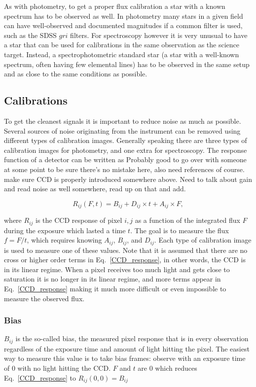 \documentclass[a4paper,oneside,12pt, class=Latex/Classes/PhDthesisPSnPDF, crop=false]{standalone}
\begin{document}
As with photometry, to get a proper flux calibration a star with a known spectrum has to be observed as well. In photometry many stars in a given field can have well-observed and documented magnitudes if a common filter is used, such as the SDSS $gri$ filters. For spectroscopy however it is very unusual to have a star that can be used for calibrations in the same observation as the science target. Instead, a spectrophotometric standard star (a star with a well-known spectrum, often having few elemental lines) has to be observed in the same setup and as close to the same conditions as possible.

\subsection{Calibrations}
To get the cleanest signals it is important to reduce noise as much as possible. Several sources of noise originating from the instrument can be removed using different types of calibration images. Generally speaking there are three types of calibration images for photometry, and one extra for spectroscopy. The response function of a detector can be written as \color{red} Probably good to go over with someone at some point to be sure there's no mistake here, also need references of course. make sure CCD is properly introduced somewhere above. Need to talk about gain and read noise as well somewhere, read up on that and add. \color{black}

\begin{equation}
	R_{ij}(F, t) = B_{ij} + D_{ij} \times t + A_{ij} \times F,
	\label{CCD_response}
\end{equation}

where $R_{ij}$ is the CCD response of pixel $i,j$ as a function of the integrated flux $F$ during the exposure which lasted a time $t$. The goal is to measure the flux $f = F/t$, which requires knowing $A_{ij}$, $B_{ij}$, and $D_{ij}$. Each type of calibration image is used to measure one of these values. Note that it is assumed that there are no cross or higher order terms in Eq.~\ref{CCD_response}, in other words, the CCD is in its linear regime. When a pixel receives too much light and gets close to saturation it is no longer in its linear regime, and more terms appear in Eq.~\ref{CCD_response} making it much more difficult or even impossible to measure the observed flux.

\subsubsection*{Bias}
$B_{ij}$ is the so-called bias, the measured pixel response that is in every observation regardless of the exposure time and amount of light hitting the pixel. The easiest way to measure this value is to take bias frames: observe with an exposure time of 0 with no light hitting the CCD. $F$ and $t$ are 0 which reduces Eq.~\ref{CCD_response} to $R_{ij}(0, 0) = B_{ij}$
\end{document}
